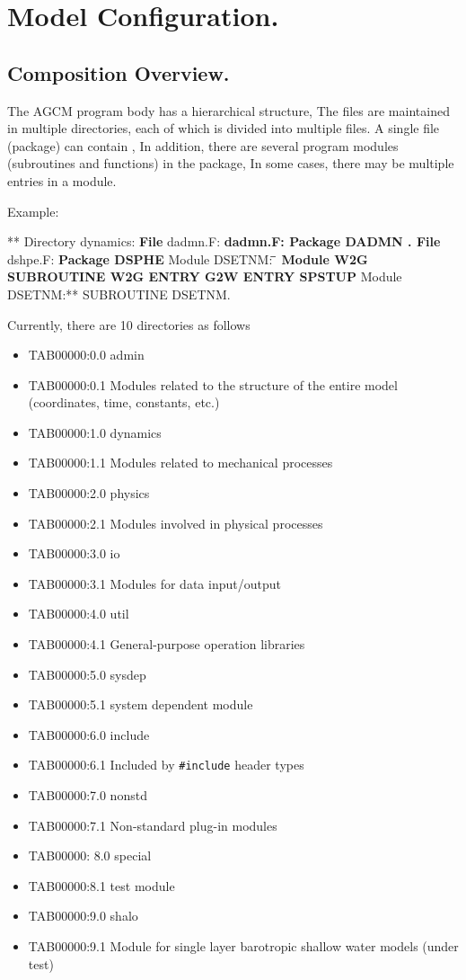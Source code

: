\hypertarget{model-configuration.}{%
\section{Model Configuration.}\label{model-configuration.}}

\hypertarget{composition-overview.}{%
\subsection{Composition Overview.}\label{composition-overview.}}

The AGCM program body has a hierarchical structure, The files are
maintained in multiple directories, each of which is divided into
multiple files. A single file (package) can contain , In addition, there
are several program modules (subroutines and functions) in the package,
In some cases, there may be multiple entries in a module.

Example:

** Directory\textbf{} dynamics: \textbf{ {\textbf{File}} }dadmn.F:
\textbf{dadmn.F: \blanket* Package DADMN . {\textbf{File}} }dshpe.F:
\textbf{ \blanket* Package DSPHE } Module DSETNM: \textbf{̄
{\textbf{Module W2G}} SUBROUTINE W2G ENTRY G2W ENTRY SPSTUP } Module
DSETNM:** SUBROUTINE DSETNM.

Currently, there are 10 directories as follows

\begin{itemize}
\item
  TAB00000:0.0 admin
\item
  TAB00000:0.1 Modules related to the structure of the entire model
  (coordinates, time, constants, etc.)
\item
  TAB00000:1.0 dynamics
\item
  TAB00000:1.1 Modules related to mechanical processes
\item
  TAB00000:2.0 physics
\item
  TAB00000:2.1 Modules involved in physical processes
\item
  TAB00000:3.0 io
\item
  TAB00000:3.1 Modules for data input/output
\item
  TAB00000:4.0 util
\item
  TAB00000:4.1 General-purpose operation libraries
\item
  TAB00000:5.0 sysdep
\item
  TAB00000:5.1 system dependent module
\item
  TAB00000:6.0 include
\item
  TAB00000:6.1 {Included by \texttt{\#include}} header types
\item
  TAB00000:7.0 nonstd
\item
  TAB00000:7.1 Non-standard plug-in modules
\item
  TAB00000: 8.0 special
\item
  TAB00000:8.1 test module
\item
  TAB00000:9.0 shalo
\item
  TAB00000:9.1 Module for single layer barotropic shallow water models
  (under test)
\end{itemize}

